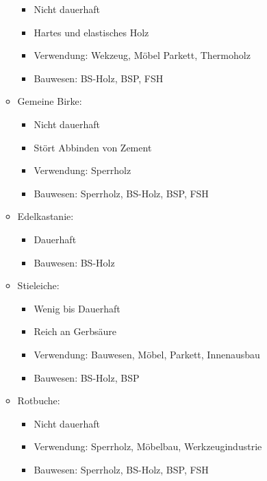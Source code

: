 \documentclass[fleqn,twoside]{article}
\begin{document}
\begin{itemize}
\begin{itemize}
\begin{itemize}
                            \item Nicht dauerhaft
                            \item Hartes und elastisches Holz
                            \item Verwendung: Wekzeug, Möbel Parkett, Thermoholz
                            \item Bauwesen: BS-Holz, BSP, FSH
                        \end{itemize}
                    \item Gemeine Birke:
                        \begin{itemize}
                            \item Nicht dauerhaft
                            \item Stört Abbinden von Zement
                            \item Verwendung: Sperrholz
                            \item Bauwesen: Sperrholz, BS-Holz, BSP, FSH
                        \end{itemize}
                    \item Edelkastanie:
                        \begin{itemize}
                            \item Dauerhaft
                            \item Bauwesen: BS-Holz
                        \end{itemize}
                    \item Stieleiche:
                        \begin{itemize}
                            \item Wenig bis Dauerhaft
                            \item Reich an Gerbsäure
                            \item Verwendung: Bauwesen, Möbel, Parkett, Innenausbau
                            \item Bauwesen: BS-Holz, BSP
                        \end{itemize}
                    \item Rotbuche:
                        \begin{itemize}
                            \item Nicht dauerhaft
                            \item Verwendung: Sperrholz, Möbelbau, Werkzeugindustrie
                            \item Bauwesen: Sperrholz, BS-Holz, BSP, FSH

\end{itemize}
\end{itemize}
\end{itemize}
\end{document}
